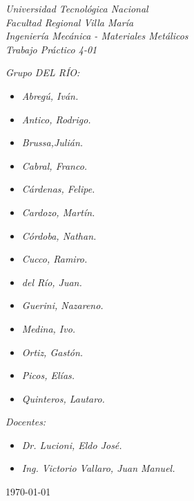 \begin{titlepage}
	
	\begin{center}
		{\huge \textit{Universidad Tecnológica Nacional}}\\
        \vspace{0.5cm}
		{\LARGE \textit{Facultad Regional Villa María}}\\
		\vspace{1.5cm}
        {\LARGE{\textit{Ingeniería Mecánica - Materiales Metálicos}}}\\
		\vspace{1.5cm}
        \LARGE{\textit{Trabajo Práctico 4-01}}
	\end{center}
	
	\vfill

    \textit{Grupo DEL RÍO:}
	\begin{itemize}
		\item \textit{Abregú, Iván.}
		\item \textit{Antico, Rodrigo.}
		\item \textit{Brussa,Julián.}
		\item \textit{Cabral, Franco.}
        \item \textit{Cárdenas, Felipe.}
        \item \textit{Cardozo, Martín.}
        \item \textit{Córdoba, Nathan.}
        \item \textit{Cucco, Ramiro.}
        \item \textit{del Río, Juan.}
        \item \textit{Guerini, Nazareno.}
        \item \textit{Medina, Ivo.}
        \item \textit{Ortiz, Gastón.}
        \item \textit{Picos, Elías.}
        \item \textit{Quinteros, Lautaro.}
	\end{itemize}
    
	\textit{Docentes:}
	\begin{itemize}
		\item \textit{Dr. Lucioni, Eldo José.}
		\item \textit{Ing. Victorio Vallaro, Juan Manuel.}
	\end{itemize}
	\centering
	\today
	
\end{titlepage}
